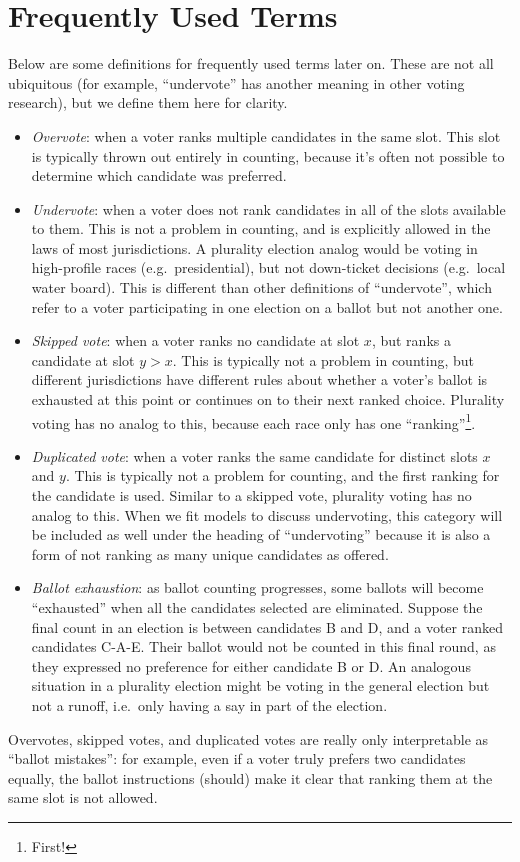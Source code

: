 \documentclass[12pt,twoside]{reedthesis}
\begin{document}
\hypertarget{frequently-used-terms}{%
\section{Frequently Used Terms}\label{frequently-used-terms}}

Below are some definitions for frequently used terms later on. These are not all ubiquitous (for example, ``undervote'' has another meaning in other voting research), but we define them here for clarity.
\begin{itemize}
\item
  \emph{Overvote}: when a voter ranks multiple candidates in the same slot. This slot is typically thrown out entirely in counting, because it's often not possible to determine which candidate was preferred.
\item
  \emph{Undervote}: when a voter does not rank candidates in all of the slots available to them. This is not a problem in counting, and is explicitly allowed in the laws of most jurisdictions. A plurality election analog would be voting in high-profile races (e.g.~presidential), but not down-ticket decisions (e.g.~local water board). This is different than other definitions of ``undervote'', which refer to a voter participating in one election on a ballot but not another one.
\item
  \emph{Skipped vote}: when a voter ranks no candidate at slot \(x\), but ranks a candidate at slot \(y > x\). This is typically not a problem in counting, but different jurisdictions have different rules about whether a voter's ballot is exhausted at this point or continues on to their next ranked choice. Plurality voting has no analog to this, because each race only has one ``ranking''\footnote{First!}.
\item
  \emph{Duplicated vote}: when a voter ranks the same candidate for distinct slots \(x\) and \(y\). This is typically not a problem for counting, and the first ranking for the candidate is used. Similar to a skipped vote, plurality voting has no analog to this. When we fit models to discuss undervoting, this category will be included as well under the heading of ``undervoting'' because it is also a form of not ranking as many unique candidates as offered.
\item
  \emph{Ballot exhaustion}: as ballot counting progresses, some ballots will become ``exhausted'' when all the candidates selected are eliminated. Suppose the final count in an election is between candidates B and D, and a voter ranked candidates C-A-E. Their ballot would not be counted in this final round, as they expressed no preference for either candidate B or D. An analogous situation in a plurality election might be voting in the general election but not a runoff, i.e.~only having a say in part of the election.
\end{itemize}
Overvotes, skipped votes, and duplicated votes are really only interpretable as ``ballot mistakes'': for example, even if a voter truly prefers two candidates equally, the ballot instructions (should) make it clear that ranking them at the same slot is not allowed.
\end{document}

